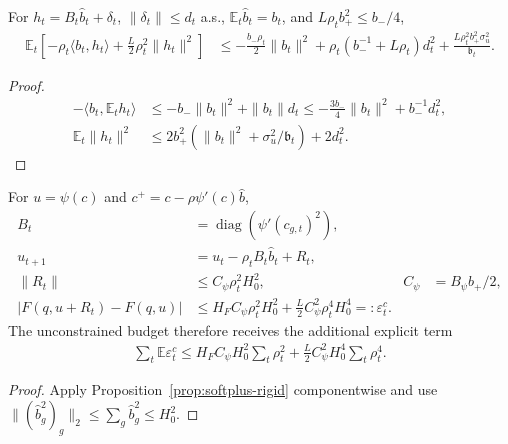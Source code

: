 \begin{lemma}
For $h_t=B_t\widehat b_t+\delta_t$, $\|\delta_t\|\le d_t$ a.s.,
$\mathbb E_t\widehat b_t=b_t$, and $L\rho_tb_+^2\le b_-/4$,
\begin{align}
 \mathbb E_t[-\rho_t\langle b_t,h_t\rangle+\tfrac L2\rho_t^2\|h_t\|^2]
 &\le-\frac{b_-\rho_t}{2}\|b_t\|^2+
 \rho_t(b_-^{-1}+L\rho_t)d_t^2+
 \frac{L\rho_t^2b_+^2\sigma_u^2}{\mathfrak b_t}.
\end{align}
\end{lemma}
\begin{proof}
\begin{align}
 -\langle b_t,\mathbb E_th_t\rangle
 &\le-b_-\|b_t\|^2+\|b_t\|d_t
 \le-\tfrac{3b_-}{4}\|b_t\|^2+b_-^{-1}d_t^2,\\
 \mathbb E_t\|h_t\|^2
 &\le2b_+^2(\|b_t\|^2+\sigma_u^2/\mathfrak b_t)+2d_t^2.
\end{align}
\end{proof}

\begin{corollary}
For $u=\psi(c)$ and $c^+=c-\rho\psi'(c)\widehat b$,
\begin{align}
 B_t&=\operatorname{diag}(\psi'(c_{g,t})^2),\\
 u_{t+1}&=u_t-\rho_tB_t\widehat b_t+R_t,\\
 \|R_t\|&\le C_\psi\rho_t^2H_0^2,&C_\psi&=B_\psi b_+/2,\\
 |F(q,u+R_t)-F(q,u)|
 &\le H_FC_\psi\rho_t^2H_0^2+
 \tfrac L2C_\psi^2\rho_t^4H_0^4=:\varepsilon_t^c.
\end{align}
The unconstrained budget therefore receives the additional explicit term
\begin{align}
 \sum_t\mathbb E\varepsilon_t^c
 \le H_FC_\psi H_0^2\sum_t\rho_t^2+
 \tfrac L2C_\psi^2H_0^4\sum_t\rho_t^4.
\end{align}
\end{corollary}
\begin{proof}
Apply Proposition~\ref{prop:softplus-rigid} componentwise and use
$\|(\widehat b_g^2)_g\|_2\le\sum_g\widehat b_g^2\le H_0^2$.
\end{proof}

